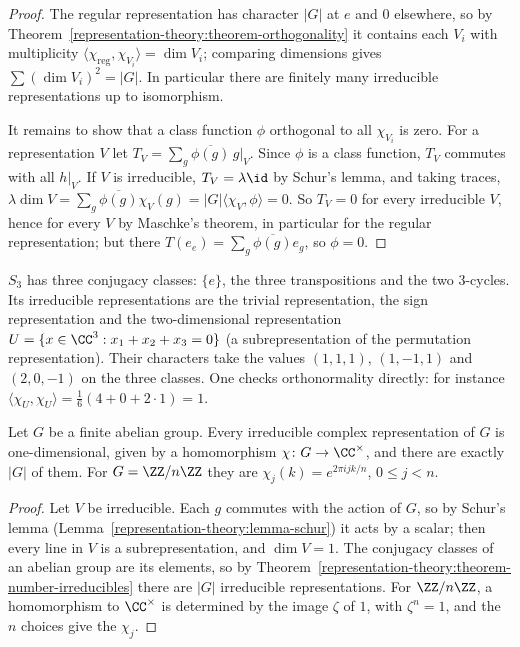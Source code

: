 \begin{proof}
The regular representation has character $|G|$ at $e$ and $0$ elsewhere, so by
Theorem~\ref{representation-theory:theorem-orthogonality} it contains each $V_i$ with multiplicity
$\langle \chi_{\mathrm{reg}}, \chi_{V_i}\rangle = \dim V_i$; comparing dimensions gives $\sum(\dim V_i)^2 = |G|$. In particular there
are finitely many irreducible representations up to isomorphism.

It remains to show that a class function $\phi$ orthogonal to all $\chi_{V_i}$ is zero. For a representation $V$ let
$T_V = \sum_g \overline{\phi(g)}\, g|_V$. Since $\phi$ is a class function, $T_V$ commutes with all $h|_V$. If $V$ is
irreducible, $T_V = \lambda \id$ by Schur's lemma, and taking traces,
$\lambda \dim V = \sum_g \overline{\phi(g)}\chi_V(g) = |G|\langle \chi_V, \phi \rangle = 0$. So $T_V = 0$ for every irreducible $V$, hence
for every $V$ by Maschke's theorem, in particular for the regular representation; but there
$T(e_e) = \sum_g \overline{\phi(g)} e_g$, so $\phi = 0$.
\end{proof}

\begin{example}\label{representation-theory:example-s3}
$S_3$ has three conjugacy classes: $\{e\}$, the three transpositions and the two $3$-cycles. Its irreducible
representations are the trivial representation, the sign representation and the two-dimensional
representation $U = \{x \in \CC^3 : x_1 + x_2 + x_3 = 0\}$ (a subrepresentation of the permutation representation).
Their characters take the values $(1, 1, 1)$, $(1, -1, 1)$ and $(2, 0, -1)$ on the three classes. One checks
orthonormality directly: for instance $\langle \chi_U, \chi_U\rangle = \frac16(4 + 0 + 2 \cdot 1) = 1$.
\end{example}

\begin{proposition}\label{representation-theory:proposition-abelian}
Let $G$ be a finite abelian group. Every irreducible complex representation of $G$ is one-dimensional, given by a homomorphism $\chi \colon G \to \CC^\times$, and there are exactly $|G|$ of them. For $G = \ZZ/n\ZZ$ they are
$\chi_j(k) = e^{2\pi ijk/n}$, $0 \leq j < n$.
\end{proposition}

\begin{proof}
Let $V$ be irreducible. Each $g$ commutes with the action of $G$, so by Schur's lemma (Lemma~\ref{representation-theory:lemma-schur}) it acts by a scalar; then every line in $V$ is a subrepresentation, and $\dim V = 1$. The conjugacy
classes of an abelian group are its elements, so by Theorem~\ref{representation-theory:theorem-number-irreducibles} there are $|G|$ irreducible representations. For $\ZZ/n\ZZ$, a homomorphism to $\CC^\times$ is determined by the image
$\zeta$ of $1$, with $\zeta^n = 1$, and the $n$ choices give the $\chi_j$.
\end{proof}

